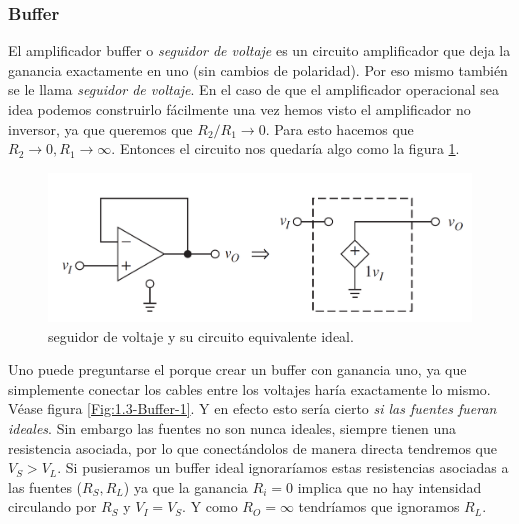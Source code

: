 \documentclass[12pt,a4paper]{article}
\numberwithin{equation}{section}
\numberwithin{figure}{section}
\begin{document}

\subsubsection{Buffer}

El amplificador buffer o \textit{seguidor de voltaje} es un circuito amplificador que deja la ganancia exactamente en uno (sin cambios de polaridad). Por eso mismo también se le llama \textit{seguidor de voltaje}. En el caso de que el amplificador operacional sea idea podemos construirlo fácilmente una vez hemos visto el amplificador no inversor, ya que queremos que $R_2/R_1 \rightarrow 0$. Para esto hacemos que $R_2 \rightarrow 0, R_1 \rightarrow \infty$. Entonces el circuito nos quedaría algo como la figura \ref{Fig:1.3-Buffer}. \\



\begin{figure}[t] \centering
\includegraphics[scale=0.4]{1.3-Buffer.png}
\caption{seguidor de voltaje y su circuito equivalente ideal.}
\label{Fig:1.3-Buffer}
\end{figure} 

Uno puede preguntarse el porque crear un buffer con ganancia uno, ya que simplemente conectar los cables entre los voltajes haría exactamente lo mismo. Véase figura \ref{Fig:1.3-Buffer-1}. Y en efecto esto sería cierto \textit{si las fuentes fueran ideales}. Sin embargo las fuentes no son nunca ideales, siempre tienen una resistencia asociada, por lo que conectándolos de manera directa tendremos que $V_S > V_L$. Si pusieramos un buffer ideal ignoraríamos estas resistencias asociadas a las fuentes ($R_S,R_L$) ya que la ganancia $R_i = 0$ implica que no hay intensidad circulando por $R_S$ y $V_I = V_S$. Y como $R_O = \infty$ tendríamos que ignoramos $R_L$.  \\
\end{document}
